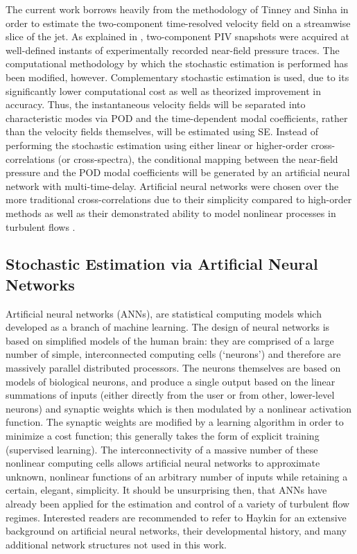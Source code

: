 The current work borrows heavily from the methodology of Tinney \etal \citep{Tinney2008b} and Sinha \etal \citep{Sinha2010} in order to estimate the two-component time-resolved velocity field on a streamwise slice of the jet.
As explained in , two-component PIV snapshots were acquired at well-defined instants of experimentally recorded near-field pressure traces.
The computational methodology by which the stochastic estimation is performed has been modified, however.
Complementary stochastic estimation is used, due to its significantly lower computational cost as well as theorized improvement in accuracy.
Thus, the instantaneous velocity fields will be separated into characteristic modes via POD and the time-dependent modal coefficients, rather than the velocity fields themselves, will be estimated using SE.
Instead of performing the stochastic estimation using either linear or higher-order cross-correlations (or cross-spectra), the conditional mapping between the near-field pressure and the POD modal coefficients will be generated by an artificial neural network with multi-time-delay.
Artificial neural networks were chosen over the more traditional cross-correlations due to their simplicity compared to high-order methods as well as their demonstrated ability to model nonlinear processes in turbulent flows \citep{Lasagna2015}.

\subsection{Stochastic Estimation via Artificial Neural Networks}
Artificial neural networks (ANNs), are statistical computing models which developed as a branch of machine learning.
The design of neural networks is based on simplified models of the human brain: they are comprised of a large number of simple, interconnected computing cells (`neurons') and therefore are massively parallel distributed processors.
The neurons themselves are based on models of biological neurons, and produce a single output based on the linear summations of inputs (either directly from the user or from other, lower-level neurons) and synaptic weights which is then modulated by a nonlinear activation function.
The synaptic weights are modified by a learning algorithm in order to minimize a cost function; this generally takes the form of explicit training (supervised learning).
The interconnectivity of a massive number of these nonlinear computing cells allows artificial neural networks to approximate unknown, nonlinear functions of an arbitrary number of inputs while retaining a certain, elegant, simplicity.
It should be unsurprising then, that ANNs have already been applied for the estimation and control of a variety of turbulent flow regimes.
Interested readers are recommended to refer to Haykin \citep{Haykin1994} for an extensive background on artificial neural networks, their developmental history, and many additional network structures not used in this work.

